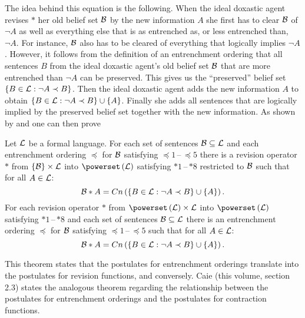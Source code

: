 The idea behind this equation is the following. When the ideal doxastic agent revises $*$ her old belief set $\cal B$ by the new information $A$ she first has to clear $\cal B$ of $\neg A$ as well as everything else that is as entrenched as, or less entrenched than, $\neg A$. For instance, $\cal B$ also has to be cleared of everything that logically implies $\neg A$. However, it follows from the definition of an entrenchment ordering that all sentences $B$ from the ideal doxastic agent's old belief set $\cal B$ that are more entrenched than $\neg A$ can be preserved. This gives us the ``preserved'' belief set $\left\{B\in\begin{cal}L\end{cal}:\neg A\prec B\right\}$. Then the ideal doxastic agent adds the new information $A$ to obtain $\left\{B\in\begin{cal}L\end{cal}:\neg A\prec B\right\}\cup\left\{A\right\}$. Finally she adds all sentences that are logically implied by the preserved belief set together with the new information. As shown by \citet{g88b} and \citet{gm88} one can then prove
\begin{theorem}\label{th1}
Let $\cal L$ be a formal language. For each set of sentences $\cal B\subseteq L$ and each entrenchment ordering $\preceq$ for $\cal B$ satisfying $\preceq \!\! 1$\,--\,$\preceq \!\! 5$ there is a revision operator $*$ from $\left\{\cal B\right\}\times\cal L$ into $\powerset\left(\cal L\right)$ satisfying $*1$\,--\,$*8$ restricted to $\cal B$ such that for all $A\in\cal L$:
$$\begin{cal}B\end{cal}*A=Cn\left(\left\{B\in\begin{cal}L\end{cal}:\neg A\prec B\right\}\cup\left\{A\right\}\right).$$
For each revision operator $*$ from $\powerset\left(\cal L\right)\times\cal L$ into $\powerset\left(\cal L\right)$ satisfying $*1$\,--\,$*8$ and each set of sentences $\cal B\subseteq L$ there is an entrenchment ordering $\preceq$ for $\cal B$ satisfying $\preceq \! 1$\,--\,$\preceq \! 5$ such that for all $A\in\cal L$:
$$\begin{cal}B\end{cal}*A=Cn\left(\left\{B\in\begin{cal}L\end{cal}:\neg A\prec B\right\}\cup\left\{A\right\}\right).$$
\end{theorem}
This theorem states that the postulates for entrenchment orderings translate into the postulates for revision functions, and conversely. Caie (this volume, section 2.3) states the analogous theorem regarding the relationship between the postulates for entrenchment orderings and the postulates for contraction functions.

